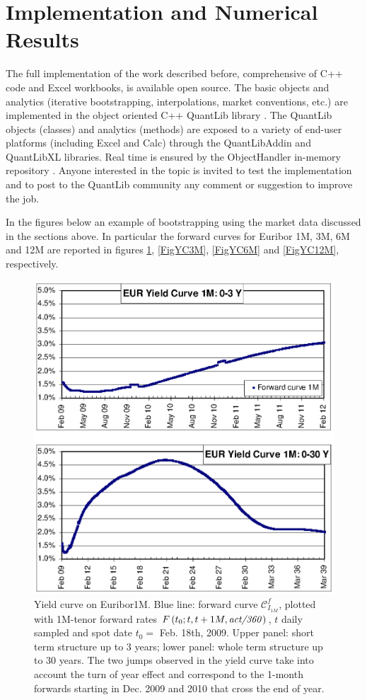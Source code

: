 \documentclass[11pt,reqno]{amsart}
\begin{document}
\section{Implementation and Numerical Results}
\label{sec:ImplementResults}
The full implementation of the work described before, comprehensive of C++ code and Excel workbooks, is available open source. The basic objects and analytics (iterative bootstrapping, interpolations, market conventions, etc.) are implemented in the object oriented C++ QuantLib library \cite{QuantLib}. The QuantLib objects (classes) and analytics (methods) are exposed to a variety of end-user platforms (including Excel and Calc) through the QuantLibAddin \cite{QuantLibAddin} and QuantLibXL \cite{QuantLibXL} libraries. Real time is ensured by the ObjectHandler in-memory repository \cite{ObjectHandler}.
Anyone interested in the topic is invited to test the implementation and to post to the QuantLib community any comment or suggestion to improve the job.
\par
In the figures below an example of bootstrapping using the market data discussed in the sections above. In particular the forward curves for Euribor 1M, 3M, 6M and 12M are reported in figures \ref{FigYC1M}, \ref{FigYC3M}, \ref{FigYC6M} and \ref{FigYC12M}, respectively.

\begin{figure}[p]
\centering
\includegraphics[scale=1.0]{./FigYC1M}
\caption{Yield curve on Euribor1M. Blue line: forward curve $\mathcal{C}_{I_{1M}}^f$, plotted with 1M-tenor forward rates $F\left( t_{0};t,t+1M,\text{\textit{act/360}}\right)$, $t$ daily sampled and spot date $t_{0}=$ Feb. 18th, 2009. Upper panel: short term structure up to 3 years; lower panel: whole term structure up to 30 years. The two jumps observed in the yield curve take into account the turn of year effect and correspond to the 1-month forwards starting in Dec. 2009 and 2010 that cross the end of year.}
\label{FigYC1M}
\end{figure}
\end{document}

